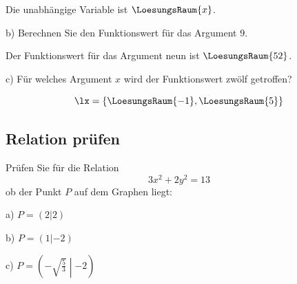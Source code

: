 Die unabhängige Variable ist $\LoesungsRaum{x}$.
\vspace{5mm}

b) Berechnen Sie den Funktionswert für das Argument $9$.
\vspace{5mm}

Der Funktionswert für das Argument neun ist $\LoesungsRaum{52}$.



c) Für welches Argument $x$ wird der Funktionswert zwölf getroffen?

$$\lx = \{\LoesungsRaum{-1}, \LoesungsRaum{5}\}$$


\subsection{Relation prüfen}
Prüfen Sie für die Relation $$3x^2 + 2y^2 = 13$$ ob der Punkt $P$ auf
dem Graphen liegt:

a) $P=(2|2)$  

\vspace{5mm}
b) $P=(1|-2)$  

\vspace{5mm}
c) $P=\left(-\sqrt{\frac{5}{3}}\middle | -2\right)$  

\vspace{5mm}




